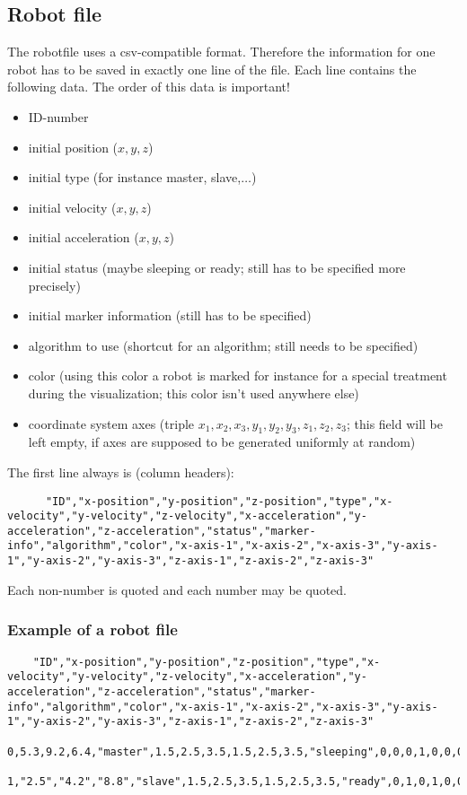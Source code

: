 \subsection{Robot file}
The robotfile uses a csv-compatible format.
Therefore the information for one robot has to be saved in exactly one line of the file.
Each line contains the following data. The order of this data is important!
\begin{itemize}
	\item ID-number
	\item initial position ($x,y,z$)
	\item initial type (for instance master, slave,$\ldots$)
	\item initial velocity ($x,y,z$)
	\item initial acceleration ($x,y,z$)
	\item initial status (maybe sleeping or ready; still has to be specified more precisely)
	\item initial marker information (still has to be specified)
	\item algorithm to use (shortcut for an algorithm; still needs to be specified)
	\item color (using this color a robot is marked for instance for a special treatment during the visualization; this color isn't used anywhere else)
	\item coordinate system axes (triple $x_1,x_2,x_3,y_1,y_2,y_3,z_1,z_2,z_3$; this field will be left empty, if axes are supposed to be generated uniformly at random)
\end{itemize}
The first line always is (column headers):
\begin{lstlisting}
	  "ID","x-position","y-position","z-position","type","x-velocity","y-velocity","z-velocity","x-acceleration","y-acceleration","z-acceleration","status","marker-info","algorithm","color","x-axis-1","x-axis-2","x-axis-3","y-axis-1","y-axis-2","y-axis-3","z-axis-1","z-axis-2","z-axis-3"
\end{lstlisting}
Each non-number is quoted and each number may be quoted.

\subsubsection{Example of a robot file}
\begin{lstlisting}
	"ID","x-position","y-position","z-position","type","x-velocity","y-velocity","z-velocity","x-acceleration","y-acceleration","z-acceleration","status","marker-info","algorithm","color","x-axis-1","x-axis-2","x-axis-3","y-axis-1","y-axis-2","y-axis-3","z-axis-1","z-axis-2","z-axis-3"
	0,5.3,9.2,6.4,"master",1.5,2.5,3.5,1.5,2.5,3.5,"sleeping",0,0,0,1,0,0,0,1,0,0,0,1
	1,"2.5","4.2","8.8","slave",1.5,2.5,3.5,1.5,2.5,3.5,"ready",0,1,0,1,0,0,0,1,0,0,0,1
\end{lstlisting}

